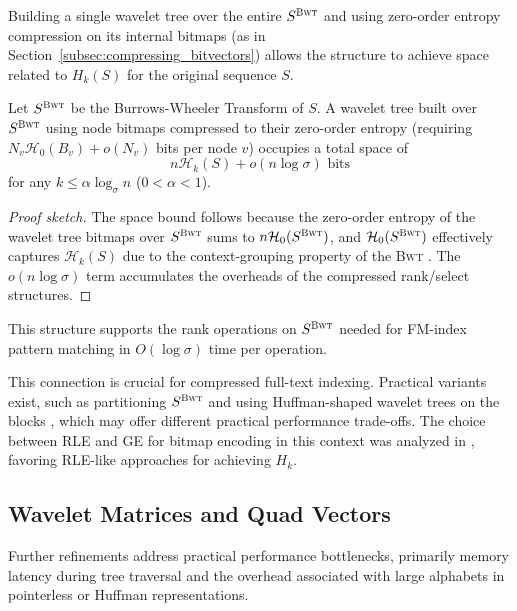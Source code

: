 Building a single wavelet tree over the entire $S^{\textsc{Bwt}}$ and using zero-order entropy compression on its internal bitmaps (as in Section~\ref{subsec:compressing_bitvectors}) allows the structure to achieve space related to $H_k(S)$ for the original sequence $S$.

\begin{theorem} \label{thm:hk_wt_space}
    Let $S^{\textsc{Bwt}}$ be the Burrows-Wheeler Transform of $S$. A wavelet tree built over $S^{\textsc{Bwt}}$ using node bitmaps compressed to their zero-order entropy (requiring $N_v \mathcal{H}_0(B_v) + o(N_v)$ bits per node $v$) occupies a total space of
    \[ n \mathcal{H}_k(S) + o(n \log \sigma) \text{ bits} \]
    for any $k \le \alpha \log_\sigma n$ ($0 < \alpha < 1$).
\end{theorem}
\begin{proof}[Proof sketch]
    The space bound follows because the zero-order entropy of the wavelet tree bitmaps over $S^{\textsc{Bwt}}$ sums to $n \mathcal{H}_0(S^{\textsc{Bwt}})$, and $\mathcal{H}_0(S^{\textsc{Bwt}})$ effectively captures $\mathcal{H}_k(S)$ due to the context-grouping property of the \textsc{Bwt} \cite{manzini2001analysis, navarro2007compressed}. The $o(n \log \sigma)$ term accumulates the overheads of the compressed rank/select structures.
\end{proof}

This structure supports the \textsf{rank} operations on $S^{\textsc{Bwt}}$ needed for FM-index pattern matching in $O(\log \sigma)$ time per operation.

This connection is crucial for compressed full-text indexing. Practical variants exist, such as partitioning $S^{\textsc{Bwt}}$ and using Huffman-shaped wavelet trees on the blocks \cite{karkkainen2011fixed}, which may offer different practical performance trade-offs. The choice between RLE and GE for bitmap encoding in this context was analyzed in \cite{TheMyriadVirtuesWT}, favoring RLE-like approaches for achieving $H_k$.

\subsection{Wavelet Matrices and Quad Vectors} \label{sec:wavelet_matrices_and_quad_vectors}

Further refinements address practical performance bottlenecks, primarily memory latency during tree traversal and the overhead associated with large alphabets in pointerless or Huffman representations.

